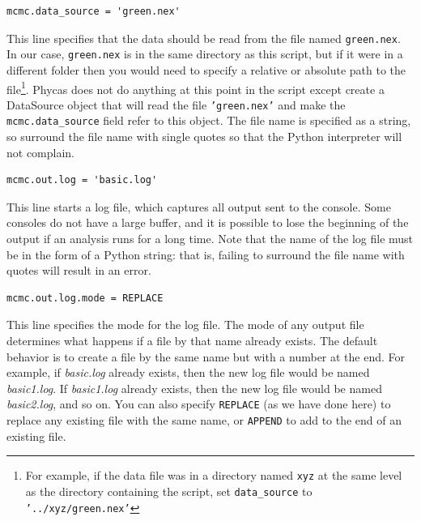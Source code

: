 \documentclass[10pt]{article}
\newcommand{\pathname}[1]{{\em #1}}				%
\newcommand{\code}[1]{{\tt #1}}					%
\newcommand{\opt}[1]{{\tt \small #1}\index{#1}}	%
\begin{document}
\begin{samepage}
\begin{verbatim}
mcmc.data_source = 'green.nex'
\end{verbatim}
This line specifies that the data should be read from the file named {\tt green.nex}. In our case, {\tt green.nex} is in the same directory as this script, but if it were in a different folder then you would need to specify a relative or absolute path to the file\footnote{
%
For example, if the data file was in a directory named {\tt xyz} at the same level as the directory containing the script, set \opt{data\_source} to {\tt '../xyz/green.nex'} }.
%
Phycas does not do anything at this point in the script except create a DataSource object that will read the file \code{'green.nex'} and make the \opt{mcmc.data\_source} field refer to this object. The file name is specified as a string, so surround the file name with single quotes so that the Python interpreter will not complain. 

\end{samepage}

\begin{samepage}
\begin{verbatim}
mcmc.out.log = 'basic.log'
\end{verbatim}
This line starts a log file, which captures all output sent to the console. Some consoles do not have a large buffer, and it is possible to lose the beginning of the output if an analysis runs for a long time. Note that the name of the log file must be in the form of a Python string: that is, failing to surround the file name with quotes will result in an error.
\end{samepage}

\begin{samepage}
\begin{verbatim}
mcmc.out.log.mode = REPLACE
\end{verbatim}
This line specifies the mode for the log file. The mode of any output file determines what happens if a file by that name already exists. The default behavior is to create a file by the same name but with a number at the end. For example, if \pathname{basic.log} already exists, then the new log file would be named \pathname{basic1.log}. If \pathname{basic1.log} already exists, then the new log file would be named \pathname{basic2.log}, and so on. You can also specify \code{REPLACE} (as we have done here) to replace any existing file with the same name, or \code{APPEND} to add to the end of an existing file. 
\end{samepage}
\end{document}
